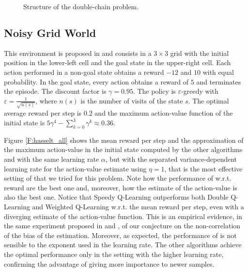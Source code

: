 \documentclass[conference]{IEEEtran}
\begin{document}
\begin{figure}[t]
\begin{center}
\end{center}
\caption{Structure of the double-chain problem.}
\label{F:double-chain}
\end{figure}

\subsection{Noisy Grid World}
This environment is proposed in \cite{van2010double} and consists in a $3 \times 3$ grid with the initial position in the lower-left cell and the goal state in the upper-right cell. Each action performed in a non-goal state obtains a reward $-12$ and $10$ with equal probability. In the goal state, every action obtains a reward of $5$ and terminates the episode. The discount factor is $\gamma = 0.95$. The policy is $\varepsilon$-greedy with $\varepsilon = \frac{1}{\sqrt{n(s)}}$, where $n(s)$ is the number of  visits of the state $s$. The optimal average reward per step is $0.2$ and the maximum action-value function of the initial state is $5\gamma^4 - \sum_{k=0}^3 \gamma^k \approx 0.36$.

Figure \ref{F:hasselt_all} shows the mean reward per step and the approximation of the maximum action-value in the initial state computed by the other algorithms and \alg with the same learning rate $\alpha$, but with the separated variance-dependent learning rate for the action-value estimate using $\eta = 1$, that is the most effective setting of \alg that we tried for this problem. Note how the performance of \alg w.r.t. reward are the best one and, moreover, how the estimate of the action-value is also the best one. Notice that Speedy Q-Learning outperforms both Double Q-Learning and Weighted Q-Learning w.r.t. the mean reward per step, even with a diverging estimate of the action-value function. This is an empirical evidence, in the same experiment proposed in \cite{van2010double} and \cite{d2016estimating}, of our conjecture on the non-correlation of the bias of the estimation. Moreover, as expected, the performance of \alg is not sensible to the exponent used in the learning rate. The other algorithms achieve the optimal performance only in the setting with the higher learning rate, confirming the advantage of giving more importance to newer samples.
\end{document}
